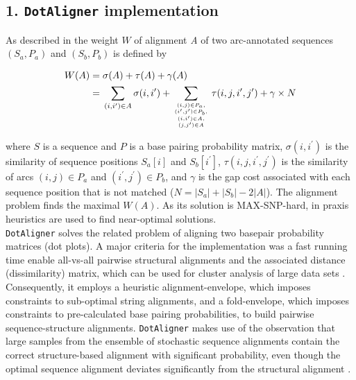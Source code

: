 \documentclass[a4paper,11pt]{article}
\newcommand\dotaligner{\texttt{DotAligner}}
\begin{document}
{\subsection*{ 1. \dotaligner{} implementation }
\noindent As described in \cite{Palu2010} the weight $W$ of alignment \emph{A}
of two arc-annotated sequences $(S_a,P_a)$ and $(S_b,P_b)$ is defined by

\begin{equation}\label{eq1}
\begin{aligned}
	W(A) ={} & \sigma(A) + \tau(A) + \gamma(A) \\
	     ={} & \sum_{(i,i^\prime) \in A} \sigma(i,i^\prime) + \sum_{(i,j) \in
	P_a,\atop {(i^\prime,j^\prime) \in P_b,\atop {(i,i^\prime) \in
	A,\atop (j,j^\prime) \in A}}} \tau(i,j,i^\prime,j^\prime) + \gamma
	\times N
\end{aligned}
\end{equation}

\noindent where $S$ is a sequence and $P$ is a base pairing probability matrix,
$\sigma(i,i^\prime)$ is the similarity of sequence positions $S_a[i]$ and
$S_b[i^\prime]$, $\tau(i,j,i^\prime,j^\prime)$ is the similarity of arcs $(i,j)
\in P_a$ and $(i^\prime,j^\prime) \in P_b$,
and $\gamma$ is the gap cost associated with each sequence position that is not
matched ($N = |S_a|+|S_b|-2|A|$). The alignment problem finds the maximal
$W(A)$. As its solution is MAX-SNP-hard, in praxis heuristics are used to find
near-optimal solutions.\\

\dotaligner{} solves the related problem of aligning two basepair
probability matrices (dot plots). A major criteria for the implementation was a fast
running time enable all-vs-all pairwise structural alignments and the 
associated distance (dissimilarity) matrix, which can be used for 
cluster analysis of large data sets \cite{Will17432929}. Consequently, 
it employs a heuristic alignment-envelope, 
which imposes constraints to sub-optimal string alignments, 
and a fold-envelope, which imposes constraints to pre-calculated base pairing probabilities, 
to build pairwise sequence-structure alignments. 
\dotaligner{} makes use of the observation that large samples from the ensemble 
of stochastic sequence alignments contain the correct structure-based alignment
with significant probability,  even though the optimal
sequence alignment deviates significantly from the structural alignment
\cite{muckstein2002stochastic}. \\

}
\end{document}
